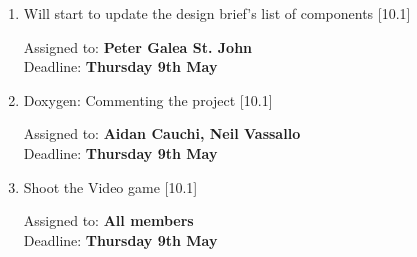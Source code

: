 \documentclass[11pt,a4paper]{article}
\begin{document}
\begin{enumerate}


\item Will start to update the design brief's list of components [10.1]
\begin{flushright}
	Assigned to: \textbf{Peter Galea St. John} \\
	Deadline: \textbf{Thursday 9th May}
\end{flushright}

\item Doxygen: Commenting the project  [10.1]
\begin{flushright}
	Assigned to: \textbf{Aidan Cauchi, Neil Vassallo} \\
	Deadline: \textbf{Thursday 9th May}
\end{flushright}

\item Shoot the Video game [10.1]
\begin{flushright}
	Assigned to: \textbf{All members} \\
	Deadline: \textbf{Thursday 9th May}
\end{flushright}

\end{enumerate}	
\end{document}
